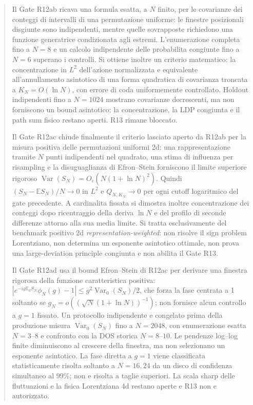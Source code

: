 \documentclass[11pt,a4paper]{article}
\begin{document}
\begin{abstract}
Il Gate R12ab ricava una formula esatta, a $N$ finito, per le covarianze dei conteggi di intervalli di una permutazione uniforme: le finestre posizionali disgiunte sono indipendenti, mentre quelle sovrapposte richiedono una funzione generatrice condizionata agli estremi. L'enumerazione completa fino a $N=8$ e un calcolo indipendente delle probabilita congiunte fino a $N=6$ superano i controlli. Si ottiene inoltre un criterio matematico: la concentrazione in $L^2$ dell'azione normalizzata e equivalente all'annullamento asintotico di una forma quadratica di covarianza troncata a $K_N=O(\ln N)$, con errore di coda uniformemente controllato. Holdout indipendenti fino a $N=1024$ mostrano covarianze decrescenti, ma non forniscono un bound asintotico: la concentrazione, la LDP congiunta e il path sum fisico restano aperti. R13 rimane bloccato.



Il Gate R12ac chiude finalmente il criterio lasciato aperto da R12ab per la misura positiva delle permutazioni uniformi 2d: una rappresentazione tramite $N$ punti indipendenti nel quadrato, una stima di influenza per risampling e la disuguaglianza di Efron--Stein forniscono il limite superiore rigoroso $\operatorname{Var}(S_N)=O_\epsilon(N(1+\ln N)^2)$. Quindi $(S_N-\mathbb ES_N)/N\to0$ in $L^2$ e $Q_{N,K_N}\to0$ per ogni cutoff logaritmico del gate precedente. A cardinalita fissata si dimostra inoltre concentrazione dei conteggi dopo ricentraggio della deriva $\ln N$ e del profilo di seconde differenze attorno alla sua media limite. Si tratta esclusivamente del benchmark positivo 2d \emph{representation-weighted}: non risolve il sign problem Lorentziano, non determina un esponente asintotico ottimale, non prova una large-deviation principle congiunta e non abilita il Gate R13.



Il Gate R12ad usa il bound Efron--Stein di R12ac per derivare una finestra rigorosa della funzione caratteristica positiva:
$|e^{-ig\mathbb E_0S_N}\phi_N(g)-1|\le g^2\operatorname{Var}_0(S_N)/2$,
che forza la fase centrata a 1 soltanto se $g_N=o((\sqrt N(1+\ln N))^{-1})$; non fornisce alcun controllo a $g=1$ fissato.
Un protocollo indipendente e congelato prima della produzione misura $\operatorname{Var}_0(S_N)$ fino a $N=2048$, con enumerazione esatta $N=3$--$8$ e confronto con la DOS storica $N=8$--$10$. Le pendenze log--log finite diminuiscono al crescere della finestra, ma non selezionano un esponente asintotico. La fase diretta a $g=1$ viene classificata statisticamente risolta soltanto a $N=16,24$ da un disco di confidenza simultaneo al 99\%; non e risolta a taglie superiori. La scala sharp delle fluttuazioni e la fisica Lorentziana 4d restano aperte e R13 non e autorizzato.



\end{abstract}
\end{document}
